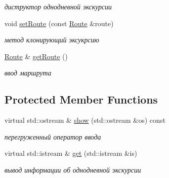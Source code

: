 \begin{DoxyCompactItemize}
\begin{DoxyCompactList}\small\item\em диструктор однодневной экскурсии \end{DoxyCompactList}\item 
\hypertarget{class_oneday_excursion_aa9379cb2bcc8d6bd5ec832ec438bfcff}{}void \hyperlink{class_oneday_excursion_aa9379cb2bcc8d6bd5ec832ec438bfcff}{set\+Route} (const \hyperlink{class_route}{Route} \&route)\label{class_oneday_excursion_aa9379cb2bcc8d6bd5ec832ec438bfcff}

\begin{DoxyCompactList}\small\item\em метод клонирующий эксукрсию \end{DoxyCompactList}\item 
\hypertarget{class_oneday_excursion_ac000b64a432e5d629c146c67afebc572}{}\hyperlink{class_route}{Route} \& \hyperlink{class_oneday_excursion_ac000b64a432e5d629c146c67afebc572}{get\+Route} ()\label{class_oneday_excursion_ac000b64a432e5d629c146c67afebc572}

\begin{DoxyCompactList}\small\item\em ввод маршрута \end{DoxyCompactList}\end{DoxyCompactItemize}
\subsection*{Protected Member Functions}
\begin{DoxyCompactItemize}
\item 
\hypertarget{class_oneday_excursion_a50e0efe6531857972e72d8085a36e3c5}{}virtual std\+::ostream \& \hyperlink{class_oneday_excursion_a50e0efe6531857972e72d8085a36e3c5}{show} (std\+::ostream \&os) const \label{class_oneday_excursion_a50e0efe6531857972e72d8085a36e3c5}

\begin{DoxyCompactList}\small\item\em перегруженный оператор ввода \end{DoxyCompactList}\item 
\hypertarget{class_oneday_excursion_a7138aa029f429ccde71a79706bcf9f89}{}virtual std\+::istream \& \hyperlink{class_oneday_excursion_a7138aa029f429ccde71a79706bcf9f89}{get} (std\+::istream \&is)\label{class_oneday_excursion_a7138aa029f429ccde71a79706bcf9f89}

\begin{DoxyCompactList}\small\item\em вывод информации об однодневной экскурсии \end{DoxyCompactList}\end{DoxyCompactItemize}
